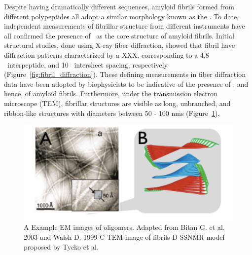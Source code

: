 Despite having dramatically different sequences, amyloid fibrils formed from different polypeptides all adopt a similar morphology known as the \crossbs.  To date, independent measurements of fibrillar structure from different instruments have all confirmed the presence of \crossbs\ as the core structure of amyloid fibrils. Initial structural studies, done using X-ray fiber diffraction, showed that fibril have diffraction patterns characterized by a XXX, corresponding to a 4.8 \angstrom\ interpeptide, and 10 \angstrom\ intersheet spacing, respectively (Figure~\ref{fig:fibril_diffraction}).  These defining measurements in fiber diffraction data have been adopted by biophysicists to be indicative of the presence of \crossbs, and hence, of amyloid fibrils. Furthermore, under the transmission electron microscope (TEM), fibrillar structures are visible as long, unbranched, and ribbon-like structures with diameters between 50 - 100 nms (Figure~\ref{fig:fibril_TEM_SSNMR}). 


\begin{figure}
  \centering
  \includegraphics[width=6in]{figures/introduction/fibril_TEM_SSNMR.pdf}
  \caption[Characteristic cross-$\beta$ spacings from X-ray fibre diffraction studies of amyloid fibrils]{A Example EM images of oligomers.  Adapted from Bitan G. et al. 2003 and Walsh D. 1999 C TEM image of fibrils D SSNMR model proposed by Tycko et al.}
  \label{fig:fibril_TEM_SSNMR}
\end{figure}

